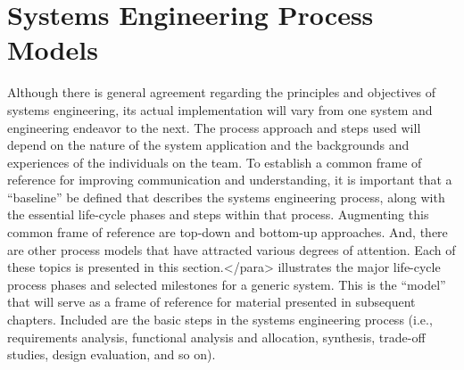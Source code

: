 
\section{Systems Engineering Process Models}

Although there is general agreement regarding the principles and objectives of systems engineering, its actual implementation will vary from one system and engineering endeavor to the next. The process approach and steps used will depend on the nature of the system application and the backgrounds and experiences of the individuals on the team.
	To establish a common frame of reference for improving communication and understanding, it is important that a “baseline” be defined that describes the systems engineering process, along with the essential life-cycle phases and steps within that process. Augmenting this common frame of reference are top-down and bottom-up approaches. And, there are other process models that have attracted various degrees of attention. Each of these topics is presented in this section.</para>
 illustrates the major life-cycle process phases and selected milestones for a generic system. This is the “model” that will serve as a frame of reference for material presented in subsequent chapters. Included are the basic steps in the systems engineering process (i.e., requirements analysis, functional analysis and allocation, synthesis, trade-off studies, design evaluation, and so on).

